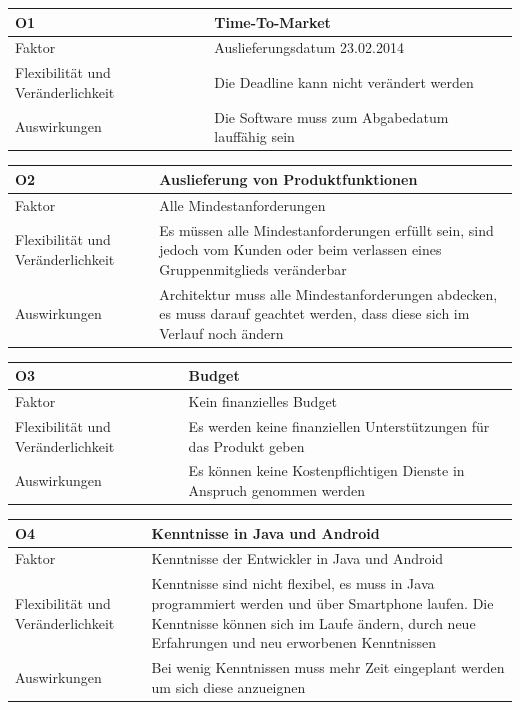 \documentclass[fontsize=12pt,paper=a4,twoside]{scrartcl}
\begin{document}
\begin{table}[H]
\begin{tabular}{|p{3cm}|p{12cm}|}\hline
O1 & Time-To-Market\\ \hline
Faktor & Auslieferungsdatum 23.02.2014\\ \hline
Flexibilität und Veränderlichkeit & Die Deadline kann nicht verändert werden\\ \hline
Auswirkungen & Die Software muss zum Abgabedatum lauffähig sein\\ \hline
\end{tabular}
\end{table}

\begin{table}[H]
\begin{tabular}{|p{3cm}|p{12cm}|}\hline
O2 & Auslieferung von Produktfunktionen\\ \hline
Faktor & Alle Mindestanforderungen\\ \hline
Flexibilität und Veränderlichkeit & Es müssen alle Mindestanforderungen erfüllt sein, sind jedoch vom Kunden oder beim verlassen eines Gruppenmitglieds veränderbar\\ \hline
Auswirkungen & Architektur muss alle Mindestanforderungen abdecken, es muss darauf geachtet werden, dass diese sich im Verlauf noch ändern\\ \hline
\end{tabular}
\end{table}

\begin{table}[H]
\begin{tabular}{|p{3cm}|p{12cm}|}\hline
O3 & Budget \\ \hline
Faktor & Kein finanzielles Budget\\ \hline
Flexibilität und Veränderlichkeit & Es werden keine finanziellen Unterstützungen für das Produkt geben \\ \hline
Auswirkungen & Es können keine Kostenpflichtigen Dienste in Anspruch genommen werden\\ \hline
\end{tabular}
\end{table}

\begin{table}[H]
\begin{tabular}{|p{3cm}|p{12cm}|}\hline
O4 & Kenntnisse in Java und Android \\ \hline
Faktor & Kenntnisse der Entwickler in Java und Android\\ \hline
Flexibilität und Veränderlichkeit & Kenntnisse sind nicht flexibel, es muss in Java programmiert werden und über Smartphone laufen. Die Kenntnisse können sich im Laufe ändern, durch neue Erfahrungen und neu erworbenen Kenntnissen\\ \hline
Auswirkungen & Bei wenig Kenntnissen muss mehr Zeit eingeplant werden um sich diese anzueignen\\ \hline
\end{tabular}
\end{table}
\end{document}
